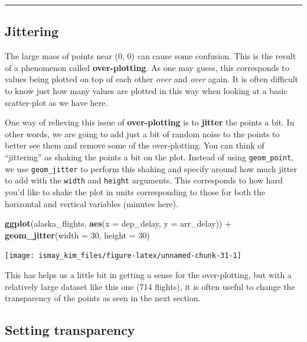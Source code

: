 \documentclass[]{tufte-book}
\newenvironment{Shaded}{\begin{snugshade}}{\end{snugshade}}
\newcommand{\KeywordTok}[1]{\textcolor[rgb]{0.13,0.29,0.53}{\textbf{{#1}}}}
\newcommand{\DataTypeTok}[1]{\textcolor[rgb]{0.13,0.29,0.53}{{#1}}}
\newcommand{\DecValTok}[1]{\textcolor[rgb]{0.00,0.00,0.81}{{#1}}}
\newcommand{\StringTok}[1]{\textcolor[rgb]{0.31,0.60,0.02}{{#1}}}
\newcommand{\NormalTok}[1]{{#1}}
\begin{document}
\begin{center}\rule{0.5\linewidth}{\linethickness}\end{center}

\subsection{Jittering}\label{jittering}

The large mass of points near (0, 0) can cause some confusion. This is
the result of a phenomenon called \textbf{over-plotting}. As one may
guess, this corresponds to values being plotted on top of each other
\emph{over} and \emph{over} again. It is often difficult to know just
how many values are plotted in this way when looking at a basic
scatter-plot as we have here.

One way of relieving this issue of \textbf{over-plotting} is to
\textbf{jitter} the points a bit. In other words, we are going to add
just a bit of random noise to the points to better see them and remove
some of the over-plotting. You can think of ``jittering'' as shaking the
points a bit on the plot. Instead of using \texttt{geom\_point}, we use
\texttt{geom\_jitter} to perform this shaking and specify around how
much jitter to add with the \texttt{width} and \texttt{height}
arguments. This corresponds to how hard you'd like to shake the plot in
units corresponding to those for both the horizontal and vertical
variables (minutes here).

\begin{Shaded}
\begin{Highlighting}[]
\KeywordTok{ggplot}\NormalTok{(alaska_flights, }\KeywordTok{aes}\NormalTok{(}\DataTypeTok{x =} \NormalTok{dep_delay, }\DataTypeTok{y =} \NormalTok{arr_delay)) +}\StringTok{ }
\StringTok{  }\KeywordTok{geom_jitter}\NormalTok{(}\DataTypeTok{width =} \DecValTok{30}\NormalTok{, }\DataTypeTok{height =} \DecValTok{30}\NormalTok{)}
\end{Highlighting}
\end{Shaded}

\texttt{[image: ismay\_kim\_files/figure-latex/unnamed-chunk-31-1]}

This has helps us a little bit in getting a sense for the over-plotting,
but with a relatively large dataset like this one (714 flights), it is
often useful to change the transparency of the points as seen in the
next section.

\subsection{Setting transparency}\label{setting-transparency}
\end{document}
